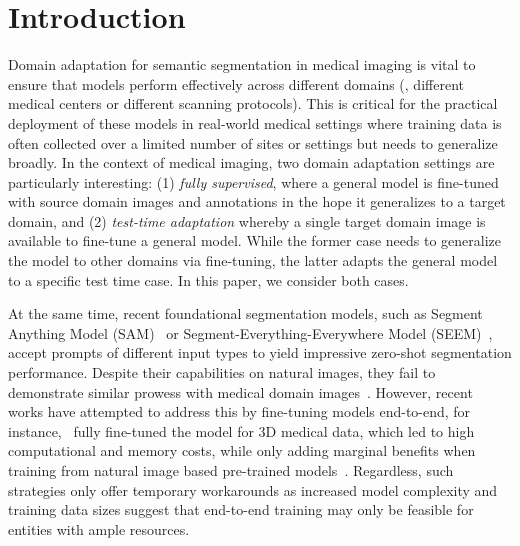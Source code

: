 \section{Introduction}
\label{sec:introduction}

Domain adaptation for semantic segmentation in medical imaging is vital to ensure that models perform effectively across different domains (\eg, different medical centers or different scanning protocols). This is critical for the practical deployment of these models in real-world medical settings where training data is often collected over a limited number of sites or settings but needs to generalize broadly. In the context of medical imaging, two domain adaptation settings are particularly interesting: (1) {\it fully supervised}, where a general model is fine-tuned with source domain images and annotations in the hope it generalizes to a target domain, and (2) {\it test-time adaptation} whereby a single target domain image is available to fine-tune a general model. While the former case needs to generalize the model to other domains via fine-tuning, the latter adapts the general model to a specific test time case. In this paper, we consider both cases. 

At the same time, recent foundational segmentation models, such as Segment Anything Model (SAM)~ or Segment-Everything-Everywhere Model (SEEM)~, accept prompts of different input types to yield impressive zero-shot segmentation performance. Despite their capabilities on natural images, they fail to demonstrate similar prowess with medical domain images~. 
However, recent works have attempted to address this by fine-tuning models end-to-end, for instance,~ fully fine-tuned the model for 3D medical data, which led to high computational and memory costs, while only adding marginal benefits when training from natural image based pre-trained models~. Regardless, such strategies only offer temporary workarounds as increased model complexity and training data sizes suggest that end-to-end training may only be feasible for entities with ample resources.

